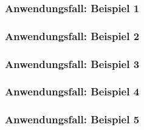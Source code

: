 \documentclass[enabledeprecatedfontcommands,fontsize=12pt,paper=a4,twoside]{scrartcl}
\begin{document}
\subsubsection{Anwendungsfall: Beispiel 1}


\subsubsection{Anwendungsfall: Beispiel 2}


\subsubsection{Anwendungsfall: Beispiel 3}


\subsubsection{Anwendungsfall: Beispiel 4}


\subsubsection{Anwendungsfall: Beispiel 5}

\end{document}
